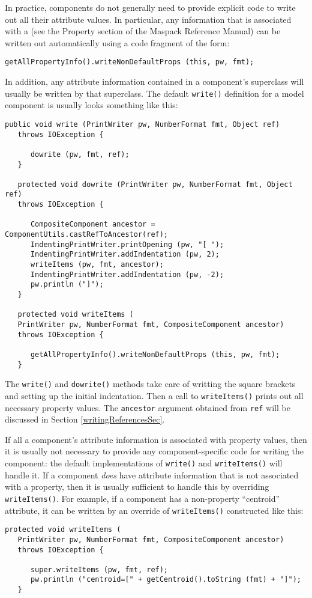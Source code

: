 \documentclass{article}
\begin{document}
In practice, components do not generally need to provide explicit code
to write out all their attribute values. In particular, any
information that is associated with a
 (see the Property section of
the Maspack Reference Manual) can be written out automatically using a
code fragment of the form:
\begin{lstlisting}[]
   getAllPropertyInfo().writeNonDefaultProps (this, pw, fmt);
\end{lstlisting}
In addition, any attribute information contained in a component's
superclass will usually be written by that superclass.
The default {\tt write()} definition for a model component
is usually looks something like this:
\begin{lstlisting}[]
   public void write (PrintWriter pw, NumberFormat fmt, Object ref)
   throws IOException {

      dowrite (pw, fmt, ref);
   }

   protected void dowrite (PrintWriter pw, NumberFormat fmt, Object ref)
   throws IOException {

      CompositeComponent ancestor = ComponentUtils.castRefToAncestor(ref);
      IndentingPrintWriter.printOpening (pw, "[ ");
      IndentingPrintWriter.addIndentation (pw, 2);
      writeItems (pw, fmt, ancestor);
      IndentingPrintWriter.addIndentation (pw, -2);
      pw.println ("]");
   }

   protected void writeItems (
   PrintWriter pw, NumberFormat fmt, CompositeComponent ancestor) 
   throws IOException {

      getAllPropertyInfo().writeNonDefaultProps (this, pw, fmt);
   }
\end{lstlisting}
The {\tt write()} and {\tt dowrite()} methods take care of writting
the square brackets and setting up the initial indentation. Then a
call to {\tt writeItems()} prints out all necessary property
values. The {\tt ancestor} argument obtained from {\tt ref} will be
discussed in Section \ref{writingReferencesSec}.

If all a component's attribute information is associated with
property values, then it is usually not necessary to provide
any component-specific code for writing the component: the
default implementations of {\tt write()} and {\tt writeItems()}
will handle it. If a component {\it does} have attribute information
that is not associated with a property, then it is
usually sufficient to handle this by overriding {\tt writeItems()}.
For example,
if a component has a non-property ``centroid'' attribute,
it can be written by an override of {\tt writeItems()} 
constructed like this:
\begin{lstlisting}[]
   protected void writeItems (
   PrintWriter pw, NumberFormat fmt, CompositeComponent ancestor) 
   throws IOException {

      super.writeItems (pw, fmt, ref);
      pw.println ("centroid=[" + getCentroid().toString (fmt) + "]");      
   }   
\end{lstlisting}
\end{document}
